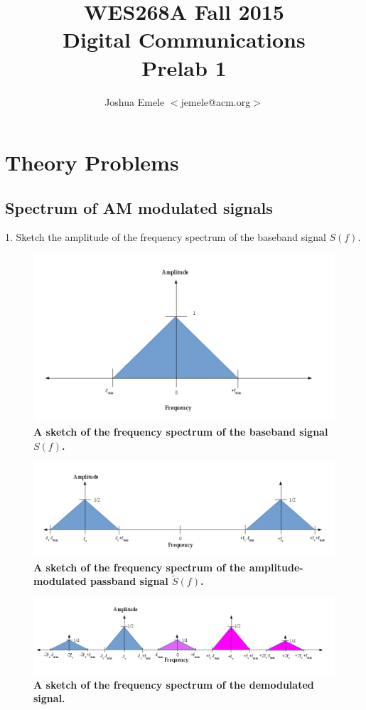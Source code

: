 \documentclass[letterpaper,12pt]{article}
\begin{document}
\title{WES268A Fall 2015 \\ Digital Communications \\ Prelab 1}
\author{Joshua Emele $<$jemele@acm.org$>$}
\maketitle

\section*{Theory Problems}

\subsection*{Spectrum of AM modulated signals}

1. Sketch the amplitude of the frequency spectrum of the baseband signal
$S(f)$.

\begin{figure}[hbtp]
\includegraphics[width=0.6\columnwidth]{prelab1-figure1}
\caption{
\label{fig:prelab1-figure1}
{\bf A sketch of the frequency spectrum of the baseband signal $S(f)$.
}
}
\end{figure}

\begin{figure}[hbtp]
\includegraphics[width=1.0\columnwidth]{prelab1-figure1a}
\caption{
\label{fig:prelab1-figure1a}
{\bf A sketch of the frequency spectrum of the amplitude-modulated passband
signal $\tilde{S}(f)$.
}
}
\end{figure}

\begin{figure}[hbtp]
\includegraphics[width=1.0\columnwidth]{prelab1-figure1b}
\caption{
\label{fig:prelab1-figure1b}
{\bf A sketch of the frequency spectrum of the demodulated signal.
}
}
\end{figure}
\pagebreak
\end{document}
